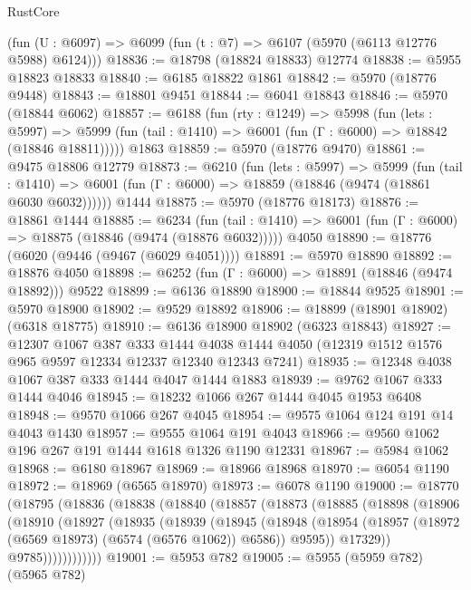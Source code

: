 \begin{lexlean}{RustCore}
\begin{coremodule}
    (fun (U : @6097) => @6099 (fun (t : @7) => @6107 (@5970 (@6113 @12776 @5988) @6124)))
@18836 := @18798 (@18824 @18833) @12774
@18838 := @5955 @18823 @18833
@18840 := @6185 @18822 @1861
@18842 := @5970 (@18776 @9448)
@18843 := @18801 @9451
@18844 := @6041 @18843
@18846 := @5970 (@18844 @6062)
@18857 := @6188
    (fun (rty : @1249) =>
    @5998
      (fun (lets : @5997) =>
      @5999 (fun (tail : @1410) => @6001 (fun (Γ : @6000) => @18842 (@18846 @18811)))))
    @1863
@18859 := @5970 (@18776 @9470)
@18861 := @9475 @18806 @12779
@18873 := @6210
    (fun (lets : @5997) =>
    @5999
      (fun (tail : @1410) =>
      @6001 (fun (Γ : @6000) => @18859 (@18846 (@9474 (@18861 @6030 @6032))))))
    @1444
@18875 := @5970 (@18776 @18173)
@18876 := @18861 @1444
@18885 := @6234
    (fun (tail : @1410) => @6001 (fun (Γ : @6000) => @18875 (@18846 (@9474 (@18876 @6032)))))
    @4050
@18890 := @18776 (@6020 (@9446 (@9467 (@6029 @4051))))
@18891 := @5970 @18890
@18892 := @18876 @4050
@18898 := @6252 (fun (Γ : @6000) => @18891 (@18846 (@9474 @18892))) @9522
@18899 := @6136 @18890
@18900 := @18844 @9525
@18901 := @5970 @18900
@18902 := @9529 @18892
@18906 := @18899 (@18901 @18902) (@6318 @18775)
@18910 := @6136 @18900 @18902 (@6323 @18843)
@18927 := @12307
    @1067
    @387
    @333
    @1444
    @4038
    @1444
    @4050
    (@12319 @1512 @1576 @965 @9597 @12334 @12337 @12340 @12343 @7241)
@18935 := @12348 @4038 @1067 @387 @333 @1444 @4047 @1444 @1883
@18939 := @9762 @1067 @333 @1444 @4046
@18945 := @18232 @1066 @267 @1444 @4045 @1953 @6408
@18948 := @9570 @1066 @267 @4045
@18954 := @9575 @1064 @124 @191 @14 @4043 @1430
@18957 := @9555 @1064 @191 @4043
@18966 := @9560 @1062 @196 @267 @191 @1444 @1618 @1326 @1190 @12331
@18967 := @5984 @1062
@18968 := @6180 @18967
@18969 := @18966 @18968
@18970 := @6054 @1190
@18972 := @18969 (@6565 @18970)
@18973 := @6078 @1190
@19000 := @18770
    (@18795
      (@18836
        (@18838
          (@18840
            (@18857
              (@18873
                (@18885
                  (@18898
                    (@18906
                      (@18910
                        (@18927
                          (@18935
                            (@18939
                              (@18945
                                (@18948
                                  (@18954
                                    (@18957 (@18972 (@6569 @18973) (@6574 (@6576 @1062)) @6586))
                                    @9595))
                                @17329))
                            @9785))))))))))))
@19001 := @5953 @782
@19005 := @5955 (@5959 @782) (@5965 @782)

\end{coremodule}
\end{lexlean}
